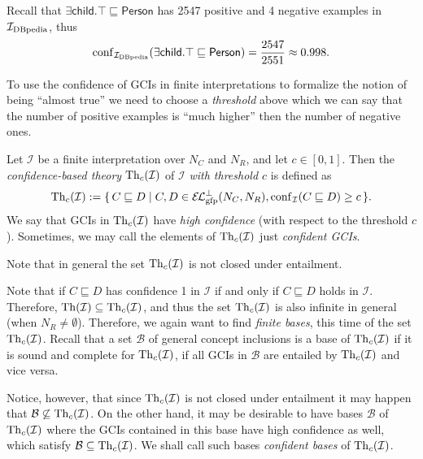 \begin{Example}
  \label{expl:Idbpedia-confidence}
  Recall that $\mathsf{\exists child. \top \sqsubseteq Person}$ has 2547 positive and 4
  negative examples in ${\mathcal{I}_{\text{DBpedia}}}$, thus
  \begin{equation*}
    \operatorname{conf}_{\mathcal{I}_{\text{DBpedia}}}( {\mathsf{\exists child. \top \sqsubseteq Person} } ) = \frac{ 2547 }{
      2551 } \approx 0.998.
  \end{equation*}
\end{Example}

To use the confidence of GCIs in finite interpretations to formalize the notion of being
``almost true'' we need to choose a \emph{threshold} above which we can say that the
number of positive examples is ``much higher'' then the number of negative ones.

\begin{Definition}
  \label{def:confident-theory-of-interpretations}
  Let $\mathcal{I}$ be a finite interpretation over $N_C$ and $N_R$, and let $c \in [0,
  1]$.  Then the \emph{confidence-based theory} $\operatorname{Th}_{c}(\mathcal{I})$ of $\mathcal{I}$
  \emph{with threshold $c$} is defined as
  \begin{equation*}
    \Th_c(\mathcal{I}) := \set{ C \sqsubseteq D \mid C, D \in \ELgfpbot(N_C, N_R),
      \conf_{\mathcal{I}}( C \sqsubseteq D ) \ge c }.
  \end{equation*}
  We say that GCIs in $\operatorname{Th}_c(\mathcal{I})$ have \emph{high confidence} (with respect to
  the threshold $c$).  Sometimes, we may call the elements of $\operatorname{Th}_c(\mathcal{I})$ just
  \emph{confident GCIs}.
\end{Definition}

Note that in general the set $\operatorname{Th}_c(\mathcal{I})$ is not closed under entailment.

Note that if $C \sqsubseteq D$ has confidence 1 in $\mathcal{I}$ if and only if $C
\sqsubseteq D$ holds in $\mathcal{I}$.  Therefore, $\operatorname{Th}(\mathcal{I}) \subseteq
\operatorname{Th}_c(\mathcal{I})$, and thus the set $\operatorname{Th}_c(\mathcal{I})$ is also infinite in general
(\ie when $N_R \neq \emptyset$).  Therefore, we again want to find \emph{finite bases},
this time of the set $\operatorname{Th}_c(\mathcal{I})$.  Recall that a set $\mathcal{B}$ of general
concept inclusions is a base of $\operatorname{Th}_c(\mathcal{I})$ if it is sound and complete for
$\operatorname{Th}_c(\mathcal{I})$, \ie if all GCIs in $\mathcal{B}$ are entailed by
$\operatorname{Th}_c(\mathcal{I})$ and vice versa.

Notice, however, that since $\operatorname{Th}_c(\mathcal{I})$ is not closed under entailment it may
happen that $\mathcal{B} \not\subseteq \operatorname{Th}_c(\mathcal{I})$.  On the other hand, it may be
desirable to have bases $\mathcal{B}$ of $\operatorname{Th}_c(\mathcal{I})$ where the GCIs contained in
this base have high confidence as well, \ie which satisfy $\mathcal{B} \subseteq
\operatorname{Th}_c(\mathcal{I})$.  We shall call such bases \emph{confident bases} of
$\operatorname{Th}_c(\mathcal{I})$.

